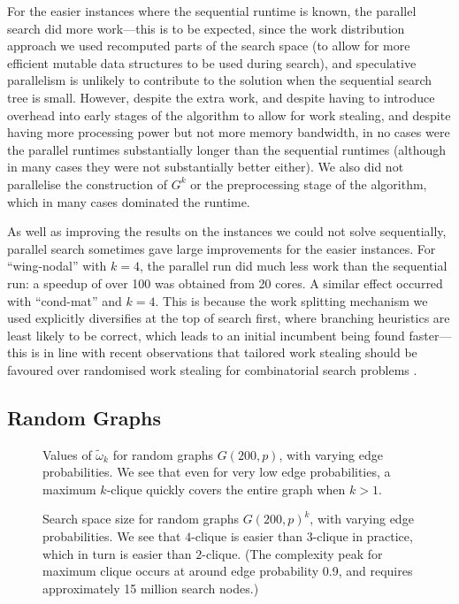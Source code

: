 \documentclass[letterpaper]{article}
\begin{document}
For the easier instances where the sequential runtime is known, the parallel search did more
work---this is to be expected, since the work distribution approach we used recomputed parts of the
search space (to allow for more efficient mutable data structures to be used during search), and
speculative parallelism is unlikely to contribute to the solution when the sequential search tree is
small. However, despite the extra work, and despite having to introduce overhead into early stages
of the algorithm to allow for work stealing, and despite having more processing power but not more
memory bandwidth, in no cases were the parallel runtimes substantially longer than the sequential
runtimes (although in many cases they were not substantially better either). We also did not
parallelise the construction of $G^k$ or the preprocessing stage of the algorithm, which in many
cases dominated the runtime.

As well as improving the results on the instances we could not solve sequentially, parallel search
sometimes gave large improvements for the easier instances. For ``wing-nodal'' with $k=4$, the
parallel run did much less work than the sequential run: a speedup of over 100 was obtained from 20
cores. A similar effect occurred with ``cond-mat'' and $k=4$. This is because the work splitting
mechanism we used explicitly diversifies at the top of search first, where branching heuristics are
least likely to be correct, which leads to an initial incumbent being found faster---this is in line
with recent observations that tailored work stealing should be favoured over randomised work
stealing for combinatorial search problems
\cite{DBLP:conf/cp/ChuSS09,DBLP:journals/topc/McCreeshP15}.

\subsection{Random Graphs}

\begin{figure}[t]
    \centering
    
    \caption{Values of $\tilde{\omega}_k$ for random graphs $G(200, p)$, with varying edge probabilities.
        We see that even for very low edge probabilities, a maximum $k$-clique
    quickly covers the entire graph when $k > 1$.}
    \label{figure:graph-omega}

    \vspace*{2em}
    \centering
    
    \caption{Search space size for random graphs $G(200, p)^k$, with varying edge probabilities. We see that
        $4$-clique is easier than $3$-clique in practice, which in turn is easier than $2$-clique. (The
        complexity peak for maximum clique occurs at around edge probability 0.9, and requires
        approximately 15 million search nodes.)}
    \label{figure:graph-nodes}
\end{figure}
\end{document}
